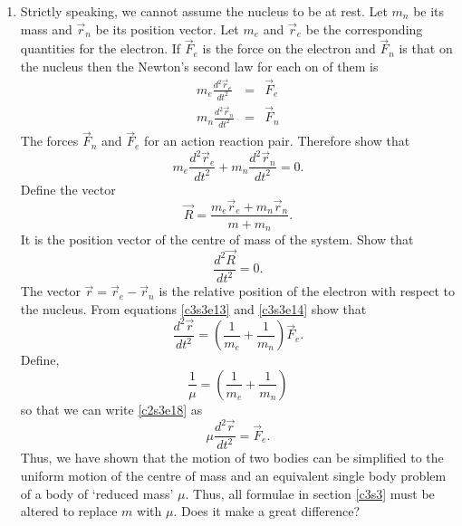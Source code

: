 \begin{enumerate}
\item Strictly speaking, we cannot assume the nucleus to be at rest. Let $m_n$
be its mass and $\vec{r}_n$ be its position vector. Let $m_e$ and $\vec{r}_e$ be 
the corresponding quantities for the electron. If $\vec{F}_e$ is the force on 
the electron and $\vec{F}_n$ is that on the nucleus then the Newton's second 
law for each on of them is
\begin{eqnarray}
m_e\frac{d^2\vec{r}_e}{dt^2} &=& \vec{F}_e \label{c3s3e13} \\
m_n\frac{d^2\vec{r}_n}{dt^2} &=& \vec{F}_n \label{c3s3e14}
\end{eqnarray}
The forces $\vec{F}_n$ and $\vec{F}_e$ for an action reaction pair. Therefore
show that
\begin{equation}\label{c3s3e15}
m_e\frac{d^2\vec{r}_e}{dt^2} + m_n\frac{d^2\vec{r}_n}{dt^2} = 0.
\end{equation}
Define the vector
\begin{equation}\label{c3s3e16}
\vec{R} = \frac{m_e\vec{r}_e + m_n\vec{r}_n}{m + m_n}.
\end{equation}
It is the position vector of the centre of mass of the system. Show that
\begin{equation}\label{c3s3e17}
\frac{d^2\vec{R}}{dt^2} = 0.
\end{equation}
The vector $\vec{r} = \vec{r}_e - \vec{r}_n$ is the relative position of
the electron with respect to the nucleus. From equations \eqref{c3s3e13} 
and \eqref{c3s3e14} show that
\begin{equation}\label{c3s3e18}
\frac{d^2\vec{r}}{dt^2} = \left(\frac{1}{m_e} + \frac{1}{m_n}\right)\vec{F}_e.
\end{equation}
Define,
\begin{equation}\label{c3s3e19}
\frac{1}{\mu} = \left(\frac{1}{m_e} + \frac{1}{m_n}\right)
\end{equation}
so that we can write \eqref{c2s3e18} as
\begin{equation}\label{c3s3e20}
\mu\frac{d^2\vec{r}}{dt^2} = \vec{F}_e.
\end{equation}
Thus, we have shown that the motion of two bodies can be simplified to the
uniform motion of the centre of mass and an equivalent single body problem 
of a body of `reduced mass' $\mu$. Thus, all formulae in section \ref{c3s3}
must be altered to replace $m$ with $\mu$. Does it make a great difference?


\end{enumerate}
